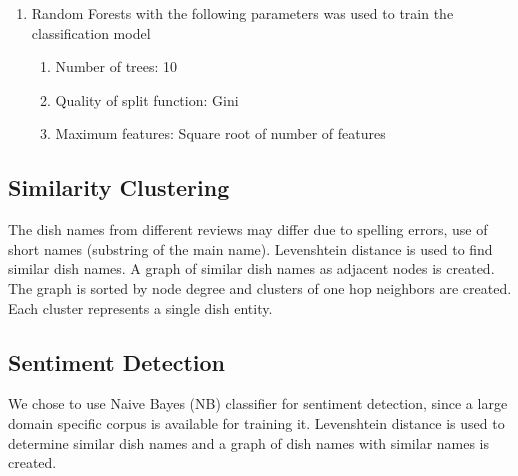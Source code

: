 \documentclass[twoside,12pt]{article}
\begin{document}
\begin{enumerate}
\item
Random Forests with the following parameters was used to train the classification model
\begin{enumerate}
\item
Number of trees: 10
\item
Quality of split function: Gini
\item
Maximum features: Square root of number of features
\end{enumerate}

\end{enumerate}

\subsection{Similarity Clustering}
The dish names from different reviews may differ due to spelling errors, use of short names (substring of the main name). Levenshtein distance is used to find similar dish names. A graph of similar dish names as adjacent nodes is created. The graph is sorted by node degree and clusters of  one hop neighbors are created. Each cluster represents a single dish entity.

\subsection{Sentiment Detection}
We chose to use Naive Bayes (NB) classifier for sentiment detection, since a large domain specific corpus is available for training it. Levenshtein distance is used to determine similar dish names and a graph of dish names with similar names is created.
\end{document}
